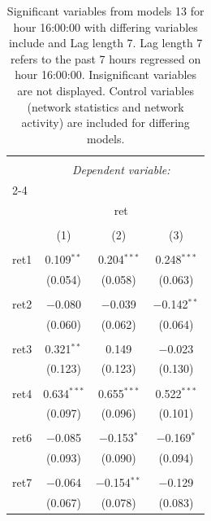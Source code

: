 
\begin{table}[!htbp] \centering 
  \caption{Significant variables from models 13 for hour 16:00:00 with differing variables include 
                               and Lag length 7. Lag length 7 refers to the past 7 hours regressed on hour 16:00:00. 
                               Insignificant variables are not displayed. 
                               Control variables (network statistics and network activity) are 
                               included for differing models.} 
  \label{RVmodels2_t_hourlagged3} 
\scriptsize 
\begin{tabular}{@{\extracolsep{5pt}}lccc} 
\\[-1.8ex]\hline 
\hline \\[-1.8ex] 
 & \multicolumn{3}{c}{\textit{Dependent variable:}} \\ 
\cline{2-4} 
\\[-1.8ex] & \multicolumn{3}{c}{ret} \\ 
\\[-1.8ex] & (1) & (2) & (3)\\ 
\hline \\[-1.8ex] 
 ret1 & 0.109$^{**}$ & 0.204$^{***}$ & 0.248$^{***}$ \\ 
  & (0.054) & (0.058) & (0.063) \\ 
  & & & \\ 
 ret2 & $-$0.080 & $-$0.039 & $-$0.142$^{**}$ \\ 
  & (0.060) & (0.062) & (0.064) \\ 
  & & & \\ 
 ret3 & 0.321$^{**}$ & 0.149 & $-$0.023 \\ 
  & (0.123) & (0.123) & (0.130) \\ 
  & & & \\ 
 ret4 & 0.634$^{***}$ & 0.655$^{***}$ & 0.522$^{***}$ \\ 
  & (0.097) & (0.096) & (0.101) \\ 
  & & & \\ 
 ret6 & $-$0.085 & $-$0.153$^{*}$ & $-$0.169$^{*}$ \\ 
  & (0.093) & (0.090) & (0.094) \\ 
  & & & \\ 
 ret7 & $-$0.064 & $-$0.154$^{**}$ & $-$0.129 \\ 
  & (0.067) & (0.078) & (0.083) \\ 

\end{tabular}
\end{table}
